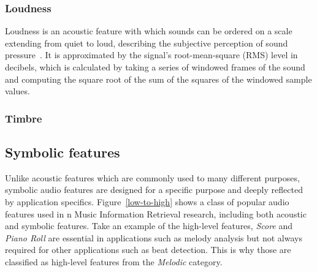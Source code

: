 \subsubsection{Loudness}
Loudness is an acoustic feature with which sounds can be ordered on a scale extending from quiet to loud, describing the subjective perception of sound pressure~\cite{sonn1073}.  It is approximated by the signal's root-mean-square (RMS) level in decibels, which is calculated by taking a series of windowed frames of the sound and computing the square root of the sum of the squares of the windowed sample values.

\subsubsection{Timbre}

\subsection{Symbolic features}
Unlike acoustic features which are commonly used to many different purposes, symbolic audio features are designed for a specific purpose and deeply reflected by application specifics. Figure~\ref{low-to-high} shows a class of popular audio features used in n Music Information Retrieval research, including both acoustic and symbolic features. Take an example of the high-level features, \textit{Score} and \textit{Piano Roll} are essential in applications such as melody analysis but not always required for other applications such as beat detection. This is why those are classified as high-level features from the \textit{Melodic} category.

